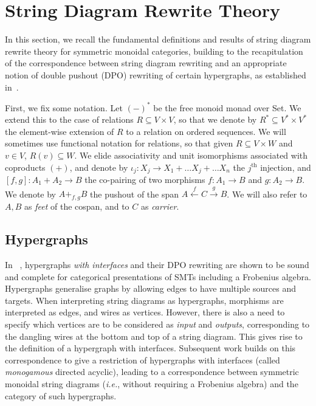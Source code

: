 \section{String Diagram Rewrite Theory}\label{sec:combinatorial-semantics}

In this section,  we recall the fundamental definitions and results of string diagram rewrite theory for symmetric monoidal categories,  building to the recapitulation of the correspondence between string diagram rewriting and an appropriate notion of double pushout (DPO) rewriting of certain hypergraphs,  as established in~\cite{bonchi_string_2022-1, bonchi_string_2022-2}.  

First,  we fix some notation.  Let $(-)^*$ be the free monoid monad over \textsf{Set}.  
We extend this to the case of relations $R \subseteq V \times V$,  so that we denote by $R^{*} \subseteq V^* \times V^*$ the element-wise extension of $R$ to a relation on ordered sequences. 
We will sometimes use functional notation for relations,  so that given $R \subseteq V \times W$ and $v \in V$,  $R(v) \subseteq W$. 
We elide associativity and unit isomorphisms associated with coproducts $(+)$,  and denote by $\iota_j: X_{j} \rightarrow X_{1} + \ldots X_{j} + \ldots X_{n}$ the $j^{\text{th}}$ injection,  and $[f,g]: A_1 + A_2 \to B$ the co-pairing of two morphisms $f: A_1 \to B$ and $g:A_2 \to B$. 
We denote by $A +_{f,g} B$ the pushout of the span $A \xleftarrow{f} C \xrightarrow{g} B$.
We will also refer to $A,B$ as \textit{feet} of the cospan, and to $C$ as \textit{carrier}.

\subsection{Hypergraphs}

In ~\cite{bonchi_string_2022-1},  hypergraphs \textit{with interfaces} and their DPO rewriting are shown to be sound and complete for categorical presentations of SMTs including a Frobenius algebra. 
Hypergraphs generalise graphs by allowing edges to have multiple sources and targets. 
When interpreting string diagrams as hypergraphs,  morphisms are interpreted as edges,  and wires as vertices.  
However,  there is also a need to specify which vertices are to be considered as \textit{input} and \textit{outputs},  corresponding to the dangling wires at the bottom and top of a string diagram. 
This gives rise to the definition of a hypergraph with interfaces.  
Subsequent work \cite{bonchi_string_2022-2} builds on this correspondence to give a restriction of hypergraphs with interfaces (called \textit{monogamous} directed acyclic),  leading to a correspondence between symmetric monoidal string diagrams (\textit{i.e.}, without requiring a Frobenius algebra) and the category of such hypergraphs.


